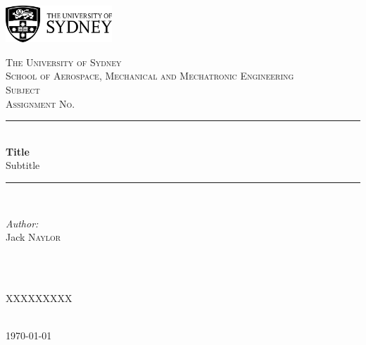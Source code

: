 \documentclass[11pt]{article}
\title{}
\begin{document}
\begin{titlepage}

\newcommand{\HRule}{\rule{\linewidth}{0.5mm}} 
\begin{flushright}
\includegraphics[width=0.3\textwidth]{usydNew.png}\\[2cm]
\end{flushright}

\center 


\textsc{\LARGE The University of Sydney}\\[0.75cm]
\textsc{\Large School of Aerospace, Mechanical and Mechatronic Engineering}\\[1cm]

\textsc{\Large Subject}\\[0.25cm] 
\textsc{\large Assignment No.}\\[1cm] 


\HRule \\[0.4cm]
{ \huge \bfseries Title}\\[0.4cm] 
{\Large Subtitle}\\[0.4cm]
\HRule \\[1.25cm]
 

\begin{minipage}{0.4\textwidth}
\begin{flushleft} \large
\emph{Author:}\\
Jack \textsc{Naylor}\\
\end{flushleft}
\end{minipage}
~
\begin{minipage}{0.4\textwidth}
\begin{flushright} \large\emph{}\\
\textsc{XXXXXXXXX}\\
\end{flushright}
\end{minipage}\\[1.5cm]


{\large \today}\\[1.5cm]



\vfill

\end{titlepage}
\newpage
{}
\cfoot{}
\rhead{}
\thispagestyle{fancy}
\pagestyle{fancy}
\setcounter{page}{1}
\end{document}
